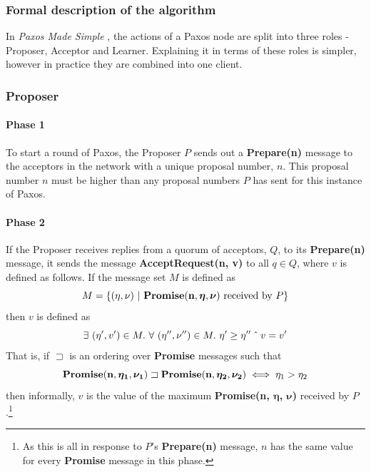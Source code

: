 \documentclass[12pt,twoside,notitlepage]{report}
\newcommand{\msg}[1] {{\bf #1}}         %
\begin{document}
\subsubsection*{Formal description of the algorithm}
In \emph{Paxos Made Simple} \cite{lamport01}, the actions of a Paxos node are split into three
roles - Proposer, Acceptor and Learner. Explaining it in terms of these roles is simpler, however
in practice they are combined into one client.

\subsubsection*{Proposer}

\paragraph{Phase 1}

To start a round of Paxos, the Proposer $P$ sends out a \msg{Prepare(n)} message to the acceptors in
the network with a unique proposal number, $n$. This proposal number $n$ must
be higher than any proposal numbers $P$ has sent for this instance of Paxos.

\paragraph{Phase 2}

If the Proposer receives replies from a quorum of acceptors, $Q$,
to its \msg{Prepare(n)} message, it sends the message \msg{AcceptRequest(n, v)} to all
$q \in Q$, where $v$ is defined as follows. If the message set $M$ is defined as
\begin{displaymath}
M = \{(\eta, \nu)~|~\msg{Promise(n, \bm{\eta}, \bm{\nu})}~\textrm{received by}~P\}
\end{displaymath}
then $v$ is defined as
\begin{displaymath}
\exists~(\eta', v') \in M.~\forall~(\eta'', \nu'') \in M.~\eta' \ge \eta'' \mathbin{\char`\^} v = v'
\end{displaymath}
That is, if $\sqsupset$ is an ordering over \msg{Promise} messages such that
\begin{displaymath}
	\msg{Promise(n, \bm{\eta_1}, \bm{\nu_1})} \sqsupset \msg{Promise(n, \bm{\eta_2}, \bm{\nu_2})}
	\iff \eta_1 > \eta_2
\end{displaymath}
then informally, $v$ is the value of the maximum \msg{Promise(n, $\bm{\eta}$, $\bm{\nu}$)} received by
$P$.\footnote{
As this is all in response to $P$'s \msg{Prepare(n)} message, $n$ has the same value for
every \msg{Promise} message in this phase.}
\end{document}
